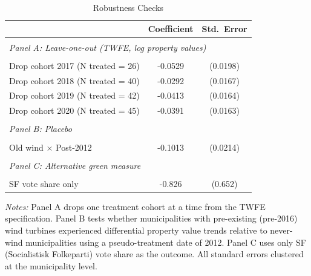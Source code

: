 \begin{table}[!ht]
\centering
\caption{Robustness Checks}
\label{tab:robustness}
\begin{tabular}{lcc}
\hline\hline
 & Coefficient & Std.~Error \\
\hline
\\[-1.2ex]
\multicolumn{3}{l}{\textit{Panel A: Leave-one-out (TWFE, log property values)}} \\
\\[-1.2ex]
Drop cohort 2017 (N treated = 26) & -0.0529 & (0.0198) \\
Drop cohort 2018 (N treated = 40) & -0.0292 & (0.0167) \\
Drop cohort 2019 (N treated = 42) & -0.0413 & (0.0164) \\
Drop cohort 2020 (N treated = 45) & -0.0391 & (0.0163) \\
\\[-1.2ex]
\multicolumn{3}{l}{\textit{Panel B: Placebo}} \\
\\[-1.2ex]
Old wind $\times$ Post-2012 & -0.1013 & (0.0214) \\
\\[-1.2ex]
\multicolumn{3}{l}{\textit{Panel C: Alternative green measure}} \\
\\[-1.2ex]
SF vote share only & -0.826 & (0.652) \\
\hline\hline
\end{tabular}
\begin{tablenotes}[flushleft]\small
\item \textit{Notes:} Panel A drops one treatment cohort at a time from the TWFE specification.
Panel B tests whether municipalities with pre-existing (pre-2016) wind turbines
experienced differential property value trends relative to never-wind municipalities
using a pseudo-treatment date of 2012. Panel C uses only SF (Socialistisk Folkeparti)
vote share as the outcome. All standard errors clustered at the municipality level.
\end{tablenotes}
\end{table}
